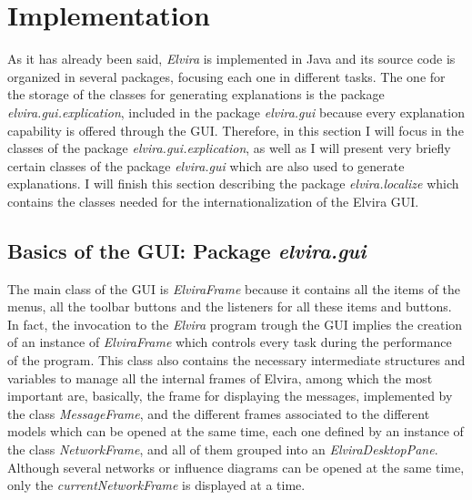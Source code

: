 \section{Implementation}

As it has already been said, {\em Elvira} is implemented in Java
and its source code is organized in several packages, focusing
each one in different tasks. The one for the storage of the
classes for generating explanations is the package {\em
elvira.gui.explication}, included in the package {\em elvira.gui}
because every explanation capability is offered through the GUI.
Therefore, in this section I will focus in the classes of the
package {\em elvira.gui.explication}, as well as I will present
very briefly certain classes of the package {\em elvira.gui} which
are also used to generate explanations. I will finish this section
describing the package {\em elvira.localize} which contains the
classes needed for the internationalization of the Elvira GUI.

\subsection{Basics of the GUI: Package \emph{elvira.gui}}

The main class of the GUI is \emph{ElviraFrame} because it
contains all the items of the menus, all the toolbar buttons and
the listeners for all these items and buttons. In fact, the
invocation to the \emph{Elvira} program trough the GUI implies the
creation of an instance of \emph{ElviraFrame} which controls every
task during the performance of the program. This class also
contains the necessary intermediate structures and variables to
manage all the internal frames of Elvira, among which the most
important are, basically, the frame for displaying the messages,
implemented by the class \emph{MessageFrame}, and the different
frames associated to the different models which can be opened at
the same time, each one defined by an instance of the class
\emph{NetworkFrame}, and all of them grouped into an
\emph{ElviraDesktopPane}. Although several networks or influence
diagrams can be opened at the same time, only the
\emph{currentNetworkFrame} is displayed at a time.

